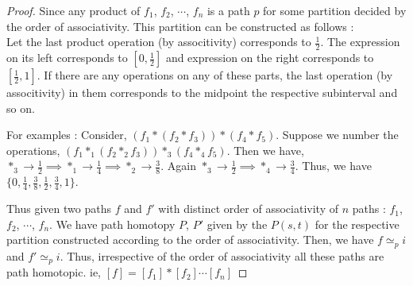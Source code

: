 \begin{proof}
	Since any product of $f_1$, $f_2$, $\cdots$, $f_n$ is a path $p$ for some partition decided by the order of associativity.
	This partition can be constructed as follows :\\
	Let the last product operation (by associtivity) corresponds to $\frac{1}{2}$.
	The expression on its left corresponds to $[0,\frac{1}{2}]$ and expression on the right corresponds to $[\frac{1}{2},1]$.
	If there are any operations on any of these parts, the last operation (by associtivity) in them corresponds to the midpoint the respective subinterval and so on.\\

\begin{commentary}
	For examples : Consider, $(f_1 \ast ( f_2 \ast f_3)) \ast (f_4 \ast f_5)$.
	Suppose we number the operations, $(f_1 \ast_1 ( f_2 \ast_2 f_3)) \ast_3 (f_4 \ast_4 f_5)$.
	Then we have,  $\ast_3 \to \frac{1}{2} \implies \ast_1 \to \frac{1}{4} \implies \ast_2 \to \frac{3}{8}$.
	Again $\ast_3 \to \frac{1}{2} \implies \ast_4 \to \frac{3}{4}$.
	Thus, we have $\{0, \frac{1}{4}, \frac{3}{8}, \frac{1}{2}, \frac{3}{4},1 \}$.\\
\end{commentary}
	
	Thus given two paths $f$ and $f'$ with distinct order of associativity of $n$ paths : $f_1$, $f_2$, $\cdots$, $f_n$.
	We have path homotopy $P$, $P'$ given by the $P(s,t)$ for the respective partition constructed according to the order of associativity.
	Then, we have $f \simeq_p i$ and $f' \simeq_p i$.
	Thus, irrespective of the order of associativity all these paths are path homotopic.
	ie, $[f] = [f_1] \ast [f_2] \cdots [f_n]$
\end{proof}

